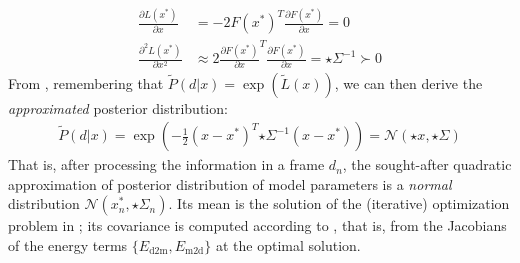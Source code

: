 %
\begin{align}
\tfrac{\partial L(x^*)}{\partial x} &= - 2 F(x^*)^T 
\tfrac{\partial F(x^*)}{\partial x} = 0 
\label{eq:taylor-jacobian}
\\
\tfrac{\partial^2 L(x^*)}{\partial x^2} 
& \approx 2 \tfrac{\partial F(x^*)}{\partial x}^T \tfrac{\partial F(x^*)}{\partial x}
= {\star{\Sigma}}^{-1} \succ 0
\label{eq:taylor-hessian}
\end{align}
% 
From , remembering that $\tilde P(d|x) = \exp (\tilde{L}(x))$, we can then derive the \emph{approximated} posterior distribution:
%
\begin{align}
\tilde{P}(d|x) = \exp\left(- \tfrac{1}{2}(x - x^*)^T {\star{\Sigma}}^{-1}  (x - x^*) \right) = \mathcal{N}\left(\star{x}, \star{\Sigma} \right)
\end{align}
%
That is, after processing the information in a frame $d_n$, the sought-after quadratic approximation of posterior distribution of model parameters is a \emph{normal} distribution $\mathcal{N}\left(x_n^*, \star\Sigma_n \right)$.
Its mean is the solution of the (iterative) optimization problem in ; its covariance is computed according to , that is, from the Jacobians of the energy terms $\{E_{\text{d2m}}, E_{\text{m2d}}\}$ at the optimal solution.

